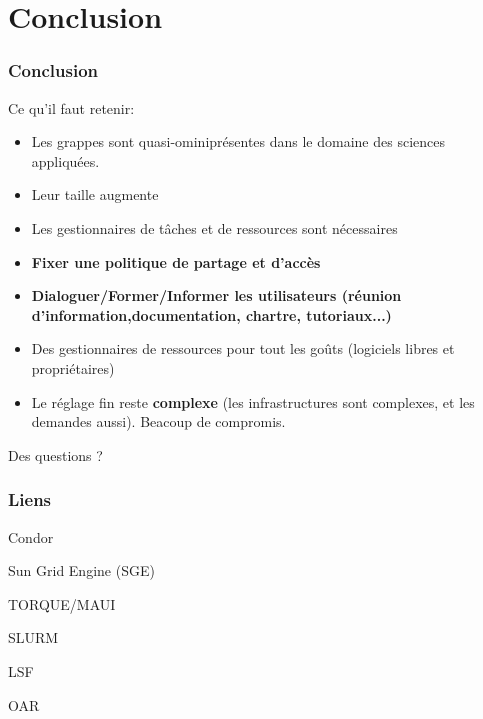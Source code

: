 \documentclass{beamer}
\begin{document}
 
\section{Conclusion}
\begin{frame}
\frametitle{Conclusion}

Ce qu'il faut retenir:

\begin{itemize}
	\item Les grappes sont quasi-ominiprésentes dans le domaine des sciences appliquées.
	\item Leur taille augmente
	\item Les gestionnaires de tâches et de ressources sont nécessaires
	\item {\bf Fixer une politique de partage et d'accès}
	\item {\bf Dialoguer/Former/Informer les utilisateurs (réunion d'information,documentation, chartre, tutoriaux...)}
	\item Des gestionnaires de ressources pour tout les goûts (logiciels libres et propriétaires)
	\item Le réglage fin reste {\bf complexe} (les infrastructures sont complexes, et les demandes aussi). Beacoup de compromis.
 \end{itemize}
\end{frame}

\begin{frame}
	\begin{center}
		{\huge Des questions ?}
	\end{center}
\end{frame}

\begin{frame}
\frametitle{Liens}
\begin{thebibliography}{Resource Management System}

	Condor 

	Sun Grid Engine (SGE) 

	TORQUE/MAUI

	SLURM

	LSF

	OAR 



\end{thebibliography}
\end{frame}
\end{document}
